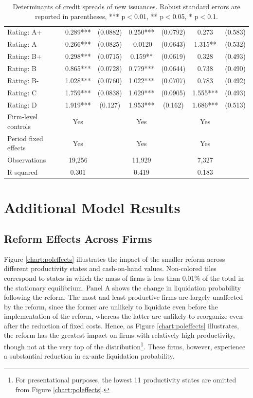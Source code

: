 \documentclass[12pt]{article}
\begin{document}
\begin{table}[H]
{\begin{tabular}{lcccccc}
Rating: A+ & 0.289*** & (0.0882) & 0.250*** & (0.0792) & 0.273 & (0.583) \\
Rating: A- & 0.266*** & (0.0825) & -0.0120 & (0.0643) & 1.315** & (0.532) \\
Rating: B+ & 0.298*** & (0.0715) & 0.159** & (0.0619) & 0.328 & (0.493) \\
Rating: B &  0.865*** & (0.0728) & 0.779*** & (0.0644) & 0.738 & (0.490) \\
Rating: B- & 1.028*** & (0.0760) & 1.022*** & (0.0707) & 0.783 & (0.492) \\
Rating: C & 1.759*** & (0.0838) & 1.629*** & (0.0905) & 1.555*** & (0.493) \\
Rating: D & 1.919*** & (0.127) & 1.953*** & (0.162) & 1.686*** & (0.513) \\
\midrule
Firm-level controls & Yes & & Yes & & Yes & \\
Period fixed effects & Yes & & Yes & & Yes & \\
Observations & 19,256 & & 11,929 & & 7,327 & \\
R-squared & 0.301 & & 0.419 & & 0.183 & \\
\bottomrule
\end{tabular}%
}
\caption{\small Determinants of credit spreads of new issuances. Robust standard errors are reported in parentheses, *** p$<$0.01, ** p$<$0.05, * p$<$0.1.}
\end{table}


\section{Additional Model Results \label{sec:appmodelresults}}

\subsection{Reform Effects Across Firms \label{sec:appliqrisk}}

Figure \ref{chart:poleffects} illustrates the impact of the smaller reform across different productivity states and cash-on-hand values. Non-colored tiles correspond to states in which the mass of firms is less than 0.01\% of the total in the stationary equilibrium. Panel A shows the change in liquidation probability following the reform. The most and least productive firms are largely unaffected by the reform, since the former are unlikely to liquidate even before the implementation of the reform, whereas the latter are unlikely to reorganize even after the reduction of fixed costs. Hence, as Figure \ref{chart:poleffects} illustrates, the reform has the greatest impact on firms with relatively high productivity, though not at the very top of the distribution\footnote{For presentational purposes, the lowest 11 productivity states are omitted from Figure \ref{chart:poleffects}.}. These firms, however, experience a substantial reduction in ex-ante liquidation probability.
\end{document}
